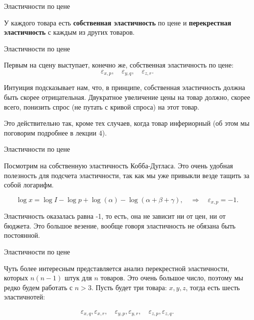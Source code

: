\documentclass{beamer}
\begin{document}
\begin{frame}{Эластичности по цене}

У каждого товара есть \textbf{собственная эластичность} по цене и \textbf{перекрестная эластичность} с каждым из других товаров. 

\end{frame}

\begin{frame}{Эластичности по цене}

Первым на сцену выступает, конечно же, собственная эластичность по цене:
$$\varepsilon_{x,p}, \quad \varepsilon_{y,q}, \quad \varepsilon_{z,r}.$$

Интуиция подсказывает нам, что, в принципе, собственная эластичность должна быть скорее отрицательная. Двукратное увеличение цены на товар должно, скорее всего, понизить спрос (не путать с кривой спроса) на этот товар. 

Это действительно так, кроме тех случаев, когда товар инфериорный (об этом мы поговорим подробнее в лекции 4).

\end{frame}

\begin{frame}{Эластичности по цене}

Посмотрим на собственную эластичность Кобба-Дугласа. Это очень удобная полезность для подсчета эластичности, так как мы уже привыкли везде тащить за собой логарифм.

$$\log x = \log I - \log p + \log(\alpha) - \log(\alpha + \beta + \gamma), \quad \Rightarrow \quad \varepsilon_{x,p} = -1.$$

Эластичность оказалась равна -1, то есть, она не зависит ни от цен, ни от бюджета. Это большое везение, вообще говоря эластичность не обязана быть постоянной.

\end{frame}

\begin{frame}{Эластичности по цене}

Чуть более интересным представляется анализ перекрестной эластичности, которых $n(n-1)$ штук для $n$ товаров. Это очень большое число, поэтому мы редко будем работать с $n>3$. Пусть будет три товара: $x,y,z$, тогда есть шесть эластичнотей:

\begin{gather*}
\varepsilon_{x,q}, \varepsilon_{x,r}, \quad \varepsilon_{y,p}, \varepsilon_{y,r}, \quad \varepsilon_{z,p}, \varepsilon_{z,q}.
\end{gather*}

\end{frame}
\end{document}
